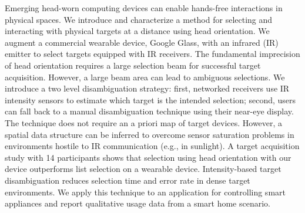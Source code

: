 
Emerging head-worn computing devices can enable hands-free interactions in physical spaces. 
%
We introduce and characterize a method for selecting and interacting with physical targets at a distance using head orientation. We augment a commercial wearable device, Google Glass, with an infrared (IR) emitter to select targets equipped with IR receivers. The fundamental imprecision of head orientation requires a large selection beam  for successful target acquisition. However, a large beam area can lead to ambiguous selections. We introduce a two level disambiguation strategy: first, networked receivers use IR intensity sensors to estimate which target is the intended selection; second, users can fall back to a manual disambiguation technique using their near-eye display. The technique does not require an a priori map of target devices. However, a spatial data structure can be inferred to overcome sensor saturation problems in environments hostile to IR communication (e.g., in sunlight).
%
A target acquisition study with 14 participants shows that selection using head orientation with our device outperforms list selection on a wearable device. Intensity-based target disambiguation reduces selection time and error rate in dense target environments. We apply this technique to an application for controlling smart appliances and report qualitative usage data from a smart home scenario.
